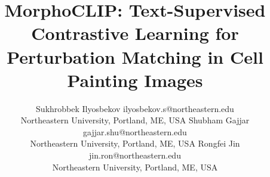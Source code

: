 \documentclass[10pt]{article}
\title{MorphoCLIP: Text-Supervised Contrastive Learning for Perturbation Matching in Cell Painting
  Images}
\author{\name Sukhrobbek Ilyosbekov \email ilyosbekov.s@northeastern.edu \\
  \addr Northeastern University, Portland, ME, USA
  \AND
  \name Shubham Gajjar \email gajjar.shu@northeastern.edu \\
  \addr Northeastern University, Portland, ME, USA
  \AND
  \name Rongfei Jin \email jin.ron@northeastern.edu \\
  \addr Northeastern University, Portland, ME, USA}
\begin{document}
\maketitle

\begin{abstract}
  
\end{abstract}











\end{document}
